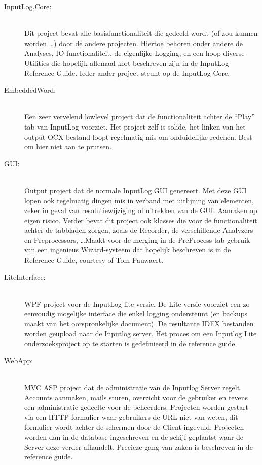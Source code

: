 \documentclass[a4paper,12pt,titlepage]{article}
\begin{document}
\begin{description}
\item[InputLog.Core:] \hfill\\ Dit project bevat alle basisfunctionaliteit die gedeeld wordt (of zou kunnen worden \ldots) door de andere projecten. Hiertoe behoren onder andere de Analyses, IO functionaliteit, de eigenlijke Logging, en een hoop diverse Utilities die hopelijk allemaal kort beschreven zijn in de InputLog Reference Guide. Ieder ander project steunt op de InputLog Core.
\item[EmbeddedWord:] \hfill\\ Een zeer vervelend lowlevel project dat de functionaliteit achter de ``Play'' tab van InputLog voorziet. Het project zelf is solide, het linken van het output OCX bestand loopt regelmatig mis om onduidelijke redenen. Best om hier niet aan te prutsen.
\item[GUI:] \hfill\\ Output project dat de normale InputLog GUI genereert. Met deze GUI lopen ook regelmatig dingen mis in verband met uitlijning van elementen, zeker in geval van resolutiewijziging of uitrekken van de GUI. Aanraken op eigen risico. Verder bevat dit project ook klasses die voor de functionaliteit achter de tabbladen zorgen, zoals de Recorder, de verschillende Analyzers en Preprocessors, \ldots Maakt voor de merging in de PreProcess tab gebruik van een ingenieus Wizard-systeem dat hopelijk beschreven is in de Reference Guide, courtesy of Tom Pauwaert.
\item[LiteInterface:] \hfill\\ WPF project voor de InputLog lite versie. De Lite versie voorziet een zo eenvoudig mogelijke interface die enkel logging ondersteunt (en backups maakt van het oorspronkelijke document). De resultante IDFX bestanden worden ge\"upload naar de Inputlog server. Het proces om een Inputlog Lite onderzoeksproject op te starten is gedefinieerd in de reference guide.
\item[WebApp:] \hfill\\ MVC ASP project dat de administratie van de Inputlog Server regelt. Accounts aanmaken, mails sturen, overzicht voor de gebruiker en tevens een administratie gedeelte voor de beheerders. Projecten worden gestart via een HTTP formulier waar gebruikers de URL niet van weten, dit formulier wordt achter de schermen door de Client ingevuld. Projecten worden dan in de database ingeschreven en de schijf geplaatst waar de Server deze verder afhandelt. Precieze gang van zaken is beschreven in de reference guide.

\end{description}
\end{document}
